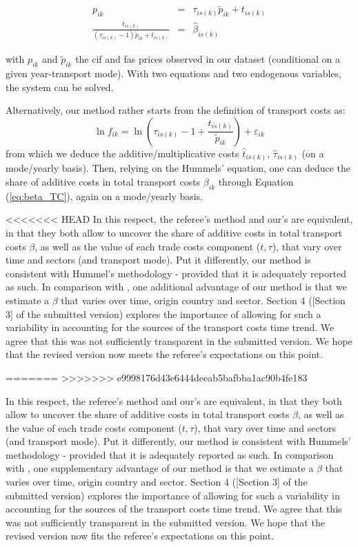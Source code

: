 \documentclass[a4paper,11pt]{article}
\begin{document}
\begin{itemize}
\begin{eqnarray}
p_{ik} &=& \tau_{is(k)}\widetilde{p}_{ik} +t_{is(k)} \label{eq:system1}\\
\frac{t_{is(k)}}{(\tau_{is(k)}-1)\widetilde{p}_{ik}+ t_{is(k)}} &=& \widehat{\beta}_{is(k)}  \label{eq:system2}
\end{eqnarray}

\noindent with $p_{ik}$ and $\widetilde{p}_{ik}$ the cif and fas prices observed in our dataset (conditional on a given year-transport mode). With two equations and two endogenous variables, the system can be solved.

 Alternatively, our method rather starts from the definition of transport costs as:
     $$\ln f_{ik} = \ln\left(\tau_{is(k)} -1 + \frac{t_{is(k)}}{\widetilde{p}_{ik}}\right) +\varepsilon_{ik}$$
\noindent from which we deduce the additive/multiplicative costs $\widehat{t}_{is(k)}$, $\widehat{\tau}_{is(k)}$ (on a mode/yearly basis). Then, relying on the Hummels' equation, one can deduce the share of additive costs in total transport costs $\beta_{ik}$ through Equation (\ref{eq:beta_TC}), again on a mode/yearly basis.

<<<<<<< HEAD
In this respect, the referee's method and our's are equivalent, in that they both allow to uncover the share of additive costs in total transport costs $\beta$, as well as the value of each trade costs component ($t,\tau$), that vary over time and sectors (and transport mode). Put it differently, our method is consistent with Hummel's methodology - provided that it is adequately reported as such. In comparison with \cite{hummels2007}, one additional advantage of our method is that we estimate a $\beta$ that varies over time, origin country and sector. Section 4 ([Section 3] of the submitted version) explores the importance of allowing for such a variability in accounting for the sources of the transport costs time trend. We agree that this was not sufficiently transparent in the submitted version. We hope that the revised version now meets the referee's expectations on this point.

\end{itemize}
=======
>>>>>>> e9998176d43e6444deeab5bafbba1ac90b4fe183

In this respect, the referee's method and our's are equivalent, in that they both allow to uncover the share of additive costs in total transport costs $\beta$, as well as the value of each trade costs component ($t,\tau$), that vary over time and sectors (and transport mode). Put it differently, our method is consistent with Hummels' methodology - provided that it is adequately reported as such. In comparison with \cite{hummels2007}, one supplementary advantage of our method is that we estimate a $\beta$ that varies over time, origin country and sector. Section 4 ([Section 3] of the submitted version) explores the importance of allowing for such a variability in accounting for the sources of the transport costs time trend. We agree that this was not sufficiently transparent in the submitted version. We hope that the revised version now fits the referee's expectations on this point.
\end{document}
